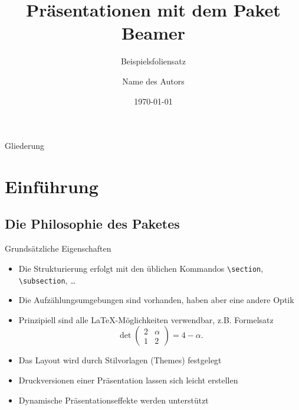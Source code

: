 \documentclass{beamer}
\title[Beamer-Paket]{Pr\"asentationen mit dem Paket \glqq Beamer \grqq}
\subtitle{Beispielsfoliensatz}
\author[Autor]{Name des Autors}
\institute[inst]{Name des Institutes}
\date{\today}
\begin{document}
\begin{frame}
    \titlepage
\end{frame}

\begin{frame}{Gliederung}
    \tableofcontents
\end{frame}

\section{Einf\"uhrung}
\subsection[Philosophie]{Die Philosophie des Paketes}

\begin{frame}[fragile=singleslide]{Grunds\"atzliche Eigenschaften}
    \begin{itemize}
        \item Die Strukturierung erfolgt mit den \"ublichen Kommandos \verb+\section+, \verb+\subsection+, \ldots
        \item Die Aufz\"ahlungsumgebungen sind vorhanden, haben aber eine andere Optik
        \item Prinzipiell sind alle \LaTeX-M\"oglichkeiten verwendbar, z.B. Formelsatz
            \begin{equation}
                \det\begin{pmatrix}2&\alpha\\1&2\end{pmatrix} = 4-\alpha.
            \end{equation}
        \item Das Layout wird durch Stilvorlagen (\alert{Themes}) festgelegt
        \item Druckversionen einer Pr\"asentation lassen sich leicht erstellen
        \item Dynamische Pr\"asentationseffekte werden unterst\"utzt
    \end{itemize}
\end{frame}
\end{document}
